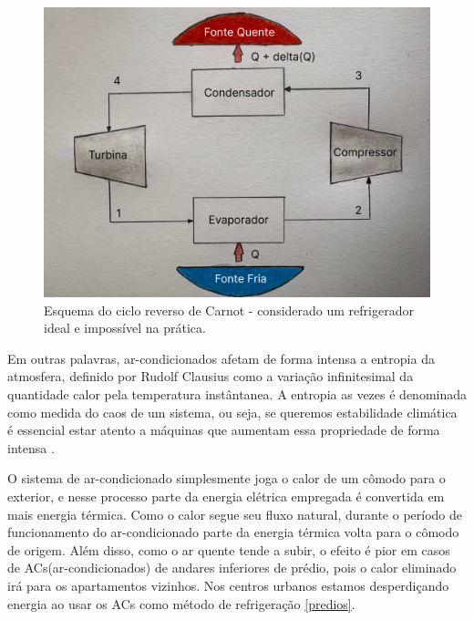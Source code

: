 \begin{figure}[ht]
    \centering
    \includegraphics[scale=0.25]{pictures/carnot.png}
    \caption{Esquema do ciclo reverso de Carnot - considerado um refrigerador ideal e impossível na prática.}
    \label{carnot}
\end{figure}

Em outras palavras, ar-condicionados afetam de forma intensa a entropia da atmosfera, definido por Rudolf Clausius como a variação infinitesimal da quantidade calor pela temperatura instântanea. A entropia as vezes é denominada como medida do caos de um sistema, ou seja, se queremos estabilidade climática é essencial estar atento a máquinas que aumentam essa propriedade de forma intensa \cite{Clausius}.

O sistema de ar-condicionado simplesmente joga o calor de um cômodo para o exterior, e nesse processo parte da energia elétrica empregada é convertida em mais energia térmica. Como o calor segue seu fluxo natural, durante o período de funcionamento do ar-condicionado parte da energia térmica volta para o cômodo de origem. Além disso, como o ar quente tende a subir, o efeito é pior em casos de ACs(ar-condicionados) de andares inferiores de prédio, pois o calor eliminado irá para os apartamentos vizinhos. Nos centros urbanos estamos desperdiçando energia ao usar os ACs como método de refrigeração \autoref{predios}.


